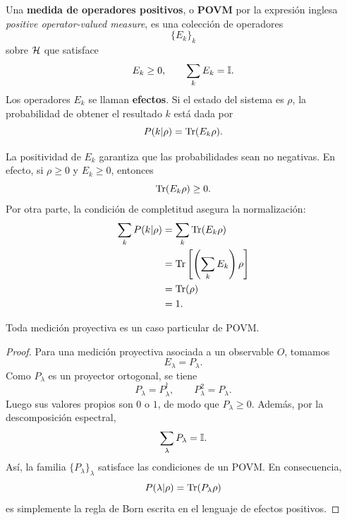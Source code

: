 \documentclass[../main.tex]{subfiles}
\begin{document}
\begin{definicion}[POVM]
Una \textbf{medida de operadores positivos}, o \textbf{POVM} por la expresión inglesa \emph{positive operator-valued measure}, es una colección de operadores
\begin{equation*}
    \{E_k\}_k
\end{equation*}
sobre $\mathcal{H}$ que satisface
\begin{equation*}
    E_k\geq 0,
    \qquad
    \sum_k E_k=\mathbb{I}.
\end{equation*}
Los operadores $E_k$ se llaman \textbf{efectos}. Si el estado del sistema es $\rho$, la probabilidad de obtener el resultado $k$ está dada por
\begin{equation*}
    P(k|\rho)=\Tr(E_k\rho).
\end{equation*}
\end{definicion}

La positividad de $E_k$ garantiza que las probabilidades sean no negativas. En efecto, si $\rho\geq0$ y $E_k\geq0$, entonces
\begin{equation*}
    \Tr(E_k\rho)\geq0.
\end{equation*}
Por otra parte, la condición de completitud asegura la normalización:
\begin{align*}
    \sum_k P(k|\rho)
    &=\sum_k\Tr(E_k\rho)\\
    &=\Tr\left[\left(\sum_kE_k\right)\rho\right]\\
    &=\Tr(\rho)\\
    &=1.
\end{align*}

\begin{proposicion}
Toda medición proyectiva es un caso particular de POVM.
\end{proposicion}

\begin{proof}
Para una medición proyectiva asociada a un observable $O$, tomamos
\begin{equation*}
    E_\lambda=P_\lambda.
\end{equation*}
Como $P_\lambda$ es un proyector ortogonal, se tiene
\begin{equation*}
    P_\lambda=P_\lambda^\dagger,
    \qquad
    P_\lambda^2=P_\lambda.
\end{equation*}
Luego sus valores propios son $0$ o $1$, de modo que $P_\lambda\geq0$. Además, por la descomposición espectral,
\begin{equation*}
    \sum_\lambda P_\lambda=\mathbb{I}.
\end{equation*}
Así, la familia $\{P_\lambda\}_\lambda$ satisface las condiciones de un POVM. En consecuencia,
\begin{equation*}
    P(\lambda|\rho)=\Tr(P_\lambda\rho)
\end{equation*}
es simplemente la regla de Born escrita en el lenguaje de efectos positivos.
\end{proof}
\end{document}

